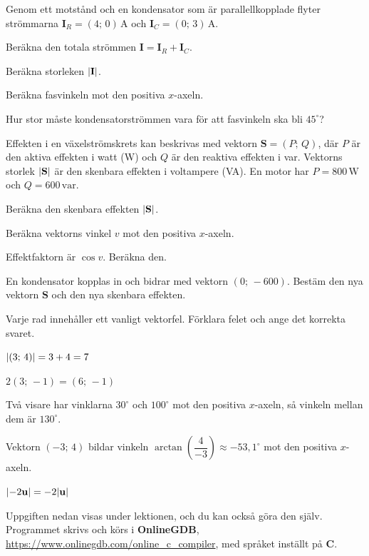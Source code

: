 Genom ett motstånd och en kondensator som är parallellkopplade flyter strömmarna $\mathbf{I}_R =
(4;\, 0)\,\text{A}$ och $\mathbf{I}_C = (0;\, 3)\,\text{A}$.
\begin{parts}
  \item Beräkna den totala strömmen $\mathbf{I} = \mathbf{I}_R + \mathbf{I}_C$.
  \item Beräkna storleken $\lvert\mathbf{I}\rvert$.
  \item Beräkna fasvinkeln mot den positiva $x$-axeln.
  \item Hur stor måste kondensatorströmmen vara för att fasvinkeln ska bli $45^{\circ}$?
\end{parts}

Effekten i en växelströmskrets kan beskrivas med vektorn $\mathbf{S} = (P;\, Q)$, där $P$ är den
aktiva effekten i watt (W) och $Q$ är den reaktiva effekten i var. Vektorns storlek
$\lvert\mathbf{S}\rvert$ är den skenbara effekten i voltampere (VA). En motor har $P = 800\,\text{W}$
och $Q = 600\,\text{var}$.
\begin{parts}
  \item Beräkna den skenbara effekten $\lvert\mathbf{S}\rvert$.
  \item Beräkna vektorns vinkel $v$ mot den positiva $x$-axeln.
  \item Effektfaktorn är $\cos v$. Beräkna den.
  \item En kondensator kopplas in och bidrar med vektorn $(0;\, -600)$. Bestäm den nya vektorn
    $\mathbf{S}$ och den nya skenbara effekten.
\end{parts}

Varje rad innehåller ett vanligt vektorfel. Förklara felet och ange det korrekta svaret.
\begin{parts}
  \item $\lvert(3;\, 4)\rvert = 3 + 4 = 7$
  \item $2(3;\, -1) = (6;\, -1)$
  \item Två visare har vinklarna $30^{\circ}$ och $100^{\circ}$ mot den positiva $x$-axeln, så vinkeln
    mellan dem är $130^{\circ}$.
  \item Vektorn $(-3;\, 4)$ bildar vinkeln $\arctan\left(\dfrac{4}{-3}\right) \approx -53{,}1^{\circ}$
    mot den positiva $x$-axeln.
  \item $\lvert-2\mathbf{u}\rvert = -2\lvert\mathbf{u}\rvert$
\end{parts}

Uppgiften nedan visas under lektionen, och du kan också göra den själv. Programmet skrivs och körs i
\textbf{OnlineGDB}, \url{https://www.onlinegdb.com/online_c_compiler}, med språket inställt på
\textbf{C}.

